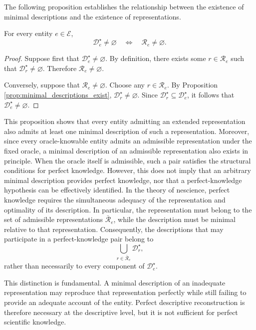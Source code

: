 The following proposition establishes the relationship between the existence of minimal descriptions and the existence of representations.

\begin{proposition}
\label{prop:minimal_descriptions_entity_nonempty}
For every entity $e\in\mathcal{E}$,
\[
\mathcal{D}_e^\star\neq\varnothing \quad\Longleftrightarrow\quad \mathcal{R}_e\neq\varnothing.
\]
\end{proposition}
\begin{proof}
Suppose first that $\mathcal{D}_e^\star\neq\varnothing$. By definition, there exists some $r\in\mathcal{R}_e$ such that $\mathcal{D}_r^\star\neq\varnothing$. Therefore $\mathcal{R}_e\neq\varnothing$.

Conversely, suppose that $\mathcal{R}_e\neq\varnothing$. Choose any $r\in\mathcal{R}_e$. By Proposition \ref{prop:minimal_descriptions_exist}, $\mathcal{D}_r^\star\neq\varnothing$. Since $\mathcal{D}_r^\star\subseteq\mathcal{D}_e^\star$, it follows that $\mathcal{D}_e^\star\neq\varnothing$.
\end{proof}

This proposition shows that every entity admitting an extended representation also admits at least one minimal description of such a representation. Moreover, since every oracle-knowable entity admits an admissible representation under the fixed oracle, a minimal description of an admissible representation also exists in principle. When the oracle itself is admissible, such a pair satisfies the structural conditions for perfect knowledge. However, this does not imply that an arbitrary minimal description provides perfect knowledge, nor that a perfect-knowledge hypothesis can be effectively identified. In the theory of nescience, perfect knowledge requires the simultaneous adequacy of the representation and optimality of its description. In particular, the representation must belong to the set of admissible representations $\bar{\mathcal{R}}_e$, while the description must be minimal relative to that representation. Consequently, the descriptions that may participate in a perfect-knowledge pair belong to
\[
\bigcup_{r\in\bar{\mathcal{R}}_e} \mathcal{D}_r^\star,
\]
rather than necessarily to every component of $\mathcal{D}_e^\star$.

This distinction is fundamental. A minimal description of an inadequate representation may reproduce that representation perfectly while still failing to provide an adequate account of the entity. Perfect descriptive reconstruction is therefore necessary at the descriptive level, but it is not sufficient for perfect scientific knowledge.

